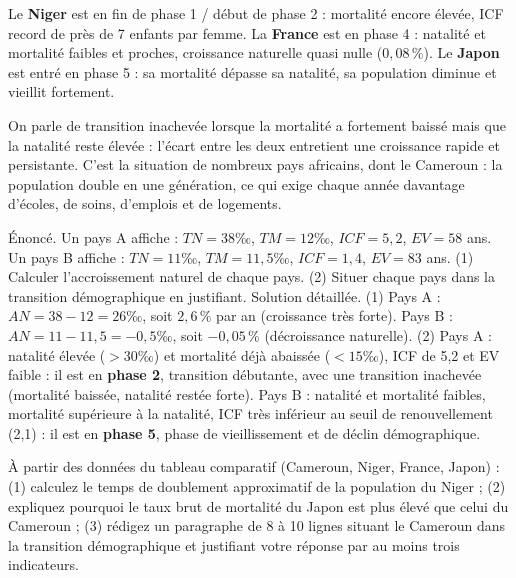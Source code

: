 \documentclass[11pt]{article}
\newcommand{\cle}[1]{{\popxbold\color{popdark}#1}}
\begin{document}
Le \textbf{Niger} est en fin de phase 1 / début de phase 2 : mortalité encore élevée, ICF record de près de 7 enfants par femme. La \textbf{France} est en phase 4 : natalité et mortalité faibles et proches, croissance naturelle quasi nulle ($0,08\,\%$). Le \textbf{Japon} est entré en phase 5 : sa mortalité dépasse sa natalité, sa population diminue et vieillit fortement.

\begin{definition}
On parle de \cle{transition inachevée} lorsque la mortalité a fortement baissé mais que la natalité reste élevée : l'écart entre les deux entretient une croissance rapide et persistante. C'est la situation de nombreux pays africains, dont le Cameroun : la population double en une génération, ce qui exige chaque année davantage d'écoles, de soins, d'emplois et de logements.
\end{definition}

\begin{exoresolu}
Énoncé. Un pays A affiche : $TN = 38$‰, $TM = 12$‰, $ICF = 5,2$, $EV = 58$ ans. Un pays B affiche : $TN = 11$‰, $TM = 11,5$‰, $ICF = 1,4$, $EV = 83$ ans. (1) Calculer l'accroissement naturel de chaque pays. (2) Situer chaque pays dans la transition démographique en justifiant.
\tcblower
Solution détaillée. (1) Pays A : $AN = 38 - 12 = 26$‰, soit $2,6\,\%$ par an (croissance très forte). Pays B : $AN = 11 - 11,5 = -0,5$‰, soit $-0,05\,\%$ (décroissance naturelle). (2) Pays A : natalité élevée ($> 30$‰) et mortalité déjà abaissée ($< 15$‰), ICF de 5,2 et EV faible : il est en \textbf{phase 2}, transition débutante, avec une transition inachevée (mortalité baissée, natalité restée forte). Pays B : natalité et mortalité faibles, mortalité supérieure à la natalité, ICF très inférieur au seuil de renouvellement (2,1) : il est en \textbf{phase 5}, phase de vieillissement et de déclin démographique.
\end{exoresolu}

\begin{exercice}
À partir des données du tableau comparatif (Cameroun, Niger, France, Japon) : (1) calculez le temps de doublement approximatif de la population du Niger ; (2) expliquez pourquoi le taux brut de mortalité du Japon est plus élevé que celui du Cameroun ; (3) rédigez un paragraphe de 8 à 10 lignes situant le Cameroun dans la transition démographique et justifiant votre réponse par au moins trois indicateurs.
\end{exercice}
\end{document}
